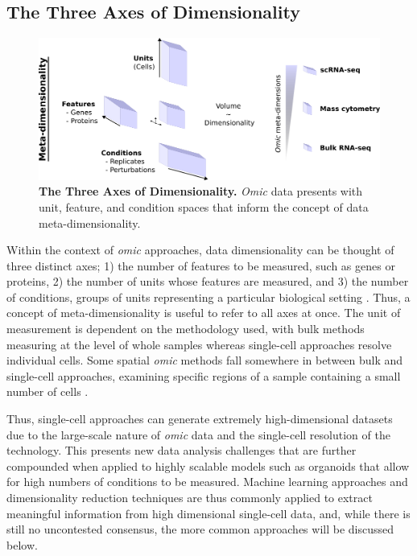 \subsection{The Three Axes of Dimensionality}

\begin{figure}[H]
    \centering
    \includegraphics{01intro/figs/1COMP_dims.png}
    \caption{\textbf{The Three Axes of Dimensionality.} \emph{Omic} data presents with unit, feature, and condition spaces that inform the concept of data meta-dimensionality.}
    \label{fig:1dims}
\end{figure}


Within the context of \emph{omic} approaches, data dimensionality can be thought of three distinct axes; 1) the number of features to be measured, such as genes or proteins, 2) the number of units whose features are measured, and 3) the number of conditions, groups of units representing a particular biological setting \cite{qin_deciphering_2020}. Thus, a concept of meta-dimensionality is useful to refer to all axes at once.
The unit of measurement is dependent on the methodology used, with bulk methods measuring at the level of whole samples whereas single-cell approaches resolve individual cells. Some spatial \emph{omic} methods fall somewhere in between bulk and single-cell approaches, examining specific regions of a sample containing a small number of cells \cite{vickovic_high-definition_2019,marx_method_2021, williams_introduction_2022}.

Thus, single-cell approaches can generate extremely high-dimensional datasets due to the large-scale nature of \emph{omic} data and the single-cell resolution of the technology. This presents new data analysis challenges that are further compounded when applied to highly scalable models such as organoids that allow for high numbers of conditions to be measured. Machine learning approaches and dimensionality reduction techniques are thus commonly applied to extract meaningful information from high dimensional single-cell data, and, while there is still no uncontested consensus, the more common approaches will be discussed below.


